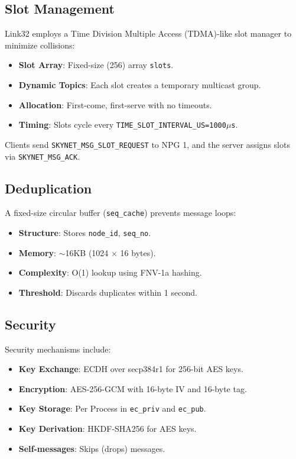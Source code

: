 \documentclass{article}
\begin{document}
\newpage
\subsection{Slot Management}
Link32 employs a Time Division Multiple Access (TDMA)-like slot manager to minimize collisions:
\begin{itemize}
    \item \textbf{Slot Array}: Fixed-size (256) array \texttt{slots}.
    \item \textbf{Dynamic Topics}: Each slot creates a temporary multicast group.
    \item \textbf{Allocation}: First-come, first-serve with no timeouts.
    \item \textbf{Timing}: Slots cycle every \texttt{TIME\_SLOT\_INTERVAL\_US=1000$\mu$s}.
\end{itemize}
Clients send \texttt{SKYNET\_MSG\_SLOT\_REQUEST} to NPG 1, and the server assigns slots via
\texttt{SKYNET\_MSG\_ACK}.

\subsection{Deduplication}
A fixed-size circular buffer (\texttt{seq\_cache}) prevents message loops:
\begin{itemize}
    \item \textbf{Structure}: Stores \texttt{node\_id}, \texttt{seq\_no}.
    \item \textbf{Memory}: $\sim$16KB (1024 $\times$ 16 bytes).
    \item \textbf{Complexity}: O(1) lookup using FNV-1a hashing.
    \item \textbf{Threshold}: Discards duplicates within 1 second.
\end{itemize}

\subsection{Security}
Security mechanisms include:
\begin{itemize}
    \item \textbf{Key Exchange}: ECDH over secp384r1 for 256-bit AES keys.
    \item \textbf{Encryption}: AES-256-GCM with 16-byte IV and 16-byte tag.
    \item \textbf{Key Storage}: Per Process in \texttt{ec\_priv} and \texttt{ec\_pub}.
    \item \textbf{Key Derivation}: HKDF-SHA256 for AES keys.
    \item \textbf{Self-messages}: Skips (drops)  messages.
\end{itemize}
\end{document}
